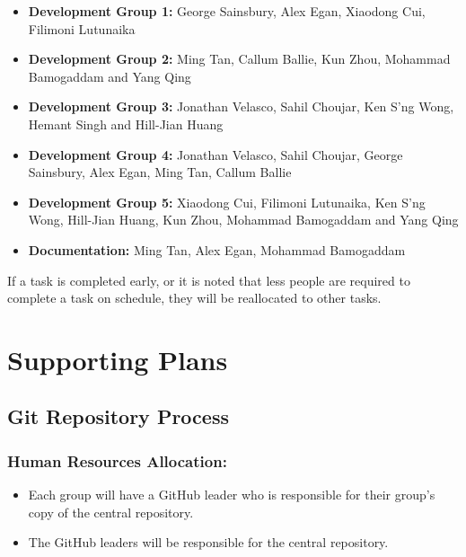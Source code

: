 \documentclass{article}
\begin{document}
\begin{itemize}
	
\item \textbf{Development Group 1:} George Sainsbury, Alex Egan, Xiaodong Cui, Filimoni Lutunaika \\

\item \textbf{Development Group 2:} Ming Tan, Callum Ballie, Kun Zhou, Mohammad Bamogaddam and Yang Qing\\

\item \textbf{Development Group 3:} Jonathan Velasco, Sahil Choujar, Ken S'ng Wong, Hemant Singh and Hill-Jian Huang\\

\item \textbf{Development Group 4:} Jonathan Velasco, Sahil Choujar, George Sainsbury, Alex Egan, Ming Tan, Callum Ballie\\

\item \textbf{Development Group 5:} Xiaodong Cui, Filimoni Lutunaika, Ken S'ng Wong, Hill-Jian Huang, Kun Zhou, Mohammad Bamogaddam and Yang Qing\\

\item \textbf{Documentation:} Ming Tan, Alex Egan, Mohammad Bamogaddam\\

\end{itemize}

If a task is completed early, or it is noted that less people are required to complete a task on schedule, they will be reallocated to other tasks.\\

\section{Supporting Plans}

\subsection{Git Repository Process}

\subsubsection{Human Resources Allocation:}
\begin{itemize}	
\item Each group will have a GitHub leader who is responsible for their group's copy of the central repository.
\item The GitHub leaders will be responsible for the central repository.
\end{itemize}
\end{document}
